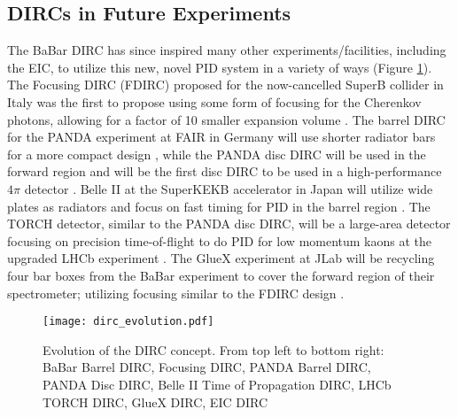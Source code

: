 \subsection{DIRCs in Future Experiments}
The BaBar DIRC has since inspired many other experiments/facilities, including the EIC, to utilize this new, novel PID system in a variety of ways (Figure \ref{fig:dirc_evolution}). The Focusing DIRC (FDIRC) proposed for the now-cancelled SuperB collider in Italy was the first to propose using some form of focusing for the Cherenkov photons, allowing for a factor of 10 smaller expansion volume \cite{FDIRC}. The barrel DIRC for the PANDA experiment at FAIR in Germany will use shorter radiator bars for a more compact design \cite{PANDA_barrel}, while the PANDA disc DIRC will be used in the forward region and will be the first disc DIRC to be used in a high-performance $4\pi$ detector \cite{PANDA_disc}. Belle II at the SuperKEKB accelerator in Japan will utilize wide plates as radiators and focus on fast timing for PID in the barrel region \cite{Belle2_TOP}. The TORCH detector, similar to the PANDA disc DIRC, will be a large-area detector focusing on precision time-of-flight to do PID for low momentum kaons at the upgraded LHCb experiment \cite{TORCH}. The GlueX experiment at JLab will be recycling four bar boxes from the BaBar experiment to cover the forward region of their spectrometer; utilizing  focusing similar to the FDIRC design \cite{GlueX}.

\begin{figure}[H]
	\centering
	\texttt{[image: dirc\_evolution.pdf]}
	\caption{Evolution of the DIRC concept. From top left to bottom right: BaBar Barrel DIRC, Focusing DIRC, PANDA Barrel DIRC, PANDA Disc DIRC, Belle II Time of Propagation DIRC, LHCb TORCH DIRC, GlueX DIRC, EIC DIRC}
	\label{fig:dirc_evolution}
\end{figure}

